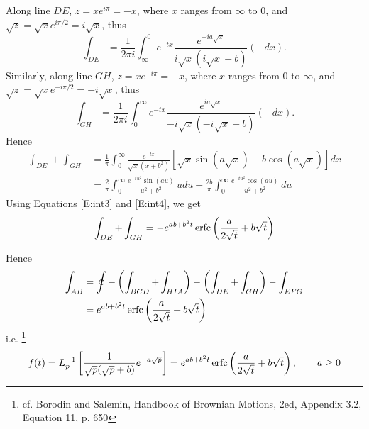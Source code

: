 Along line $DE$, $z=x e^{i\pi}=-x$, where $x$ ranges from $\infty$ to $0$, and 
$\sqrt{z}=\sqrt{x} e^{i\pi /2}= i\sqrt{x}$, thus
\[
	\int_{DE} = \frac{1}{2\pi i} 
      \int_{\infty}^0 e^{-tx} 
        \frac{e^{-i a \sqrt{x}}}{i\sqrt{x}(i\sqrt{x}+b)} (-dx).
\]
Similarly, along line $GH$, $z=x e^{-i\pi}=-x$, where $x$ ranges from $0$ to
$\infty$, and $\sqrt{z}=\sqrt{x} e^{-i\pi/2} = -i\sqrt{x}$, thus 
\[
	\int_{GH} = \frac{1}{2\pi i}  
      \int^{\infty}_0 e^{-tx} 
        \frac{e^{i a \sqrt{x}}}{-i\sqrt{x}(-i\sqrt{x}+b)} (-dx).
\]
Hence
\begin{align*}
  \int_{DE} + \int_{GH}
	&= \frac{1}{\pi} 
      \int_0^{\infty} \frac{e^{-tx}}{\sqrt{x}(x+b^2)} 
        \left[ \sqrt{x}\sin(a\sqrt{x}) - b\cos(a\sqrt{x}) \right] dx \\
  &= \frac{2}{\pi} 
       \int_0^{\infty} \frac{e^{-t u^2} \sin(a u)}{u^2+b^2} \, u du
     -\frac{2b}{\pi} 
       \int_0^{\infty} \frac{e^{-t u^2} \cos(a u)}{u^2+b^2} \, du
\end{align*}
Using Equations \ref{E:int3} and \ref{E:int4}, we get
\[
  \int_{DE} + \int_{GH}
    = -e^{a b + b^2 t} \operatorname*{erfc}\left( \frac{a}{2\sqrt{t}} + b \sqrt{t} \right)
\]

Hence 
\begin{align*}
  \int_{AB} 
	&= \oint - \left( \int_{BCD} + \int_{HIA} \right)
     - \left( \int_{DE} + \int_{GH} \right) - \int_{EFG}  \\
  &= e^{a b + b^2 t} \operatorname*{erfc}\left( \frac{a}{2\sqrt{t}} + b \sqrt{t} \right)
\end{align*}
i.e.
\footnote{cf. Borodin and Salemin, Handbook of Brownian Motions, 2ed, Appendix
3.2, Equation 11, p. 650}
\begin{equation} \label{E:ilt_1a}
  f(t) = L_p^{-1} \left[ \frac{1}{\sqrt{p}(\sqrt{p}+b)} e^{-a\sqrt{p}} \right]
       = e^{a b + b^2 t} \operatorname*{erfc}\left( \frac{a}{2\sqrt{t}} + b \sqrt{t} \right),
         \qquad a\ge 0 
\end{equation}



